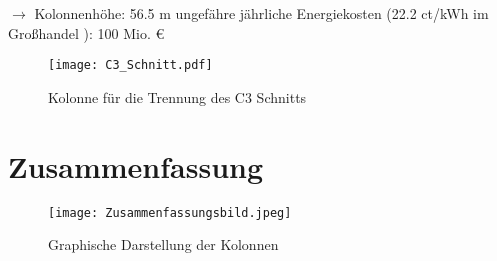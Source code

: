 \documentclass[12pt,a4paper,bibtotocnumbered,liststotocnumbered]{scrreprt}
\begin{document}
 $\rightarrow$ Kolonnenhöhe: 56.5 m
ungefähre jährliche Energiekosten (22.2  ct/kWh im Großhandel \cite{Strompreis}):  100 Mio. €
 
\begin{figure}[H]
\begin{center}
\texttt{[image: C3\_Schnitt.pdf]}
\caption{Kolonne für die Trennung des C3 Schnitts}
\label{Abb: C3_Schnitt}
\end{center}
\end{figure}

\section{Zusammenfassung}

\begin{figure}[H]
\begin{center}
\texttt{[image: Zusammenfassungsbild.jpeg]}
\caption{Graphische Darstellung der Kolonnen}
\label{Abb: C3_Schnitt}
\end{center}
\end{figure}




\newpage
\RaggedRight



\listoffigures

\listoftables
\end{document}
